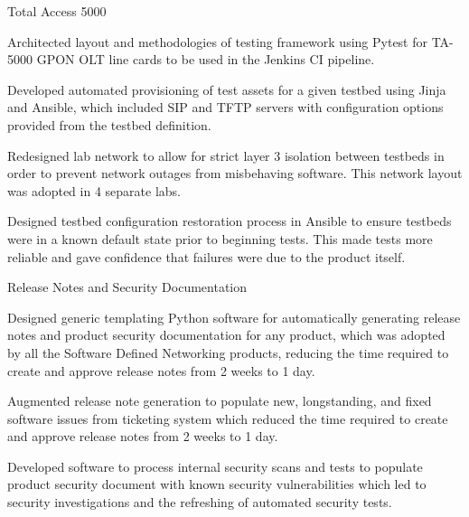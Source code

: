 \begin{cventries}
  \cventry
    {} {Total Access 5000} {} {} {
      \begin{cvitems}
        \item {Architected layout and methodologies of testing framework using Pytest for TA-5000 GPON OLT line cards to be used in the Jenkins CI pipeline.}
        \item {Developed automated provisioning of test assets for a given testbed using Jinja and Ansible, which included SIP and TFTP servers with configuration options provided from the testbed definition.}
        \item {Redesigned lab network to allow for strict layer 3 isolation between testbeds in order to prevent network outages from misbehaving software. This network layout was adopted in 4 separate labs.}
        \item {Designed testbed configuration restoration process in Ansible to ensure testbeds were in a known default state prior to beginning tests. This made tests more reliable and gave confidence that failures were due to the product itself.}
      \end{cvitems}
    }

  \cventry
    {} {Release Notes and Security Documentation} {} {} {
      \begin{cvitems}
        \item {Designed generic templating Python software for automatically generating release notes and product security documentation for any product, which was adopted by all the Software Defined Networking products, reducing the time required to create and approve release notes from 2 weeks to 1 day.}
        \item {Augmented release note generation to populate new, longstanding, and fixed software issues from ticketing system which reduced the time required to create and approve release notes from 2 weeks to 1 day.}
        \item {Developed software to process internal security scans and tests to populate product security document with known security vulnerabilities which led to security investigations and the refreshing of automated security tests.}
      \end{cvitems}
    }


\end{cventries}
